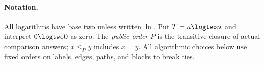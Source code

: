 \paragraph{Notation.}
All logarithms have base two unless written $\ln$.
Put $T=n\logtwo n$ and interpret $0\logtwo0$ as zero.
The \emph{public order} $P$ is the transitive closure of actual comparison
answers; $x\leq_P y$ includes $x=y$. All algorithmic choices below use fixed
orders on labels, edges, paths, and blocks to break ties.
